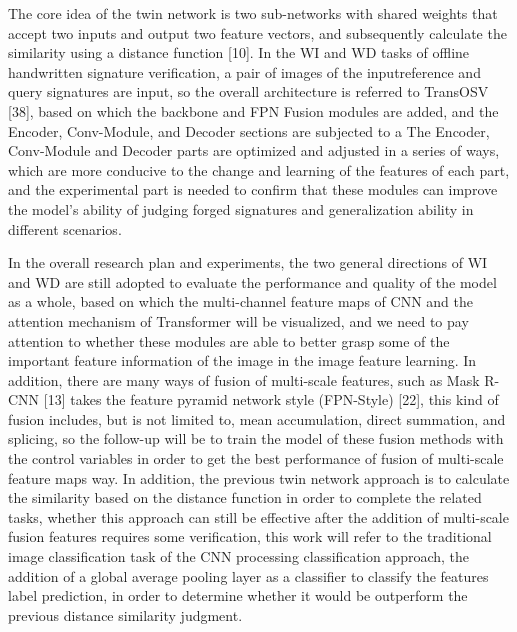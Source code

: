 The core idea of the twin network is two sub-networks with shared weights that accept two inputs and output two feature vectors, and subsequently calculate the similarity using a distance function [10]. In the WI and WD tasks of offline handwritten signature verification, a pair of images of the inputreference and query signatures are input, so the overall architecture is referred to TransOSV [38], based on which the backbone and FPN Fusion modules are added, and the Encoder, Conv-Module, and Decoder sections are subjected to a The Encoder, Conv-Module and Decoder parts are optimized and adjusted in a series of ways, which are more conducive to the change and learning of the features of each part, and the experimental part is needed to confirm that these modules can improve the model's ability of judging forged signatures and generalization ability in different scenarios.

In the overall research plan and experiments, the two general directions of WI and WD are still adopted to evaluate the performance and quality of the model as a whole, based on which the multi-channel feature maps of CNN and the attention mechanism of Transformer will be visualized, and we need to pay attention to whether these modules are able to better grasp some of the important feature information of the image in the image feature learning. In addition, there are many ways of fusion of multi-scale features, such as Mask R-CNN [13] takes the feature pyramid network style (FPN-Style) [22], this kind of fusion includes, but is not limited to, mean accumulation, direct summation, and splicing, so the follow-up will be to train the model of these fusion methods with the control variables in order to get the best performance of fusion of multi-scale feature maps way. In addition, the previous twin network approach is to calculate the similarity based on the distance function in order to complete the related tasks, whether this approach can still be effective after the addition of multi-scale fusion features requires some verification, this work will refer to the traditional image classification task of the CNN processing classification approach, the addition of a global average pooling layer as a classifier to classify the features label prediction, in order to determine whether it would be outperform the previous distance similarity judgment.

